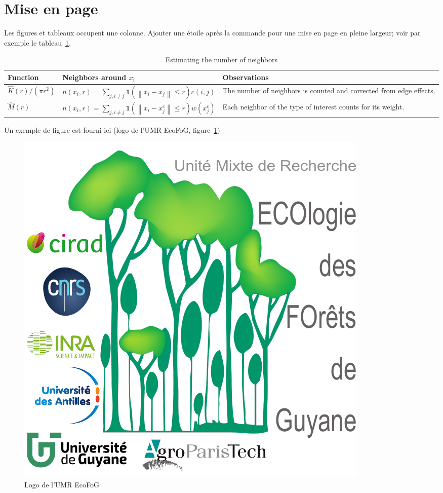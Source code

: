 \documentclass[fleqn,10pt]{ArtEcoFoG} %
\begin{document}
\section{Mise en page}\label{sec:misenpage}

Les figures et tableaux occupent une colonne.
Ajouter une étoile après la commande pour une mise en page en pleine largeur; voir par exemple le tableau~\ref{table:step1}.

\begin{table}
  \caption{Estimating the number of neighbors}
  \centering
  \begin{tabularx}{\textwidth}{p{3cm} p{7cm} X}
    \toprule
    Function & Neighbors around $x_i$ & Observations \\
    \midrule
    
    $\widehat{K} \left( r \right) / \left( \pi r^2 \right)$ 
    & $\displaystyle n\left(x_i,r\right) = \sum_{j, i \ne j} \mathbf{1} \left(\left\|x_i - x_j \right\| \le r \right) c\left( i,j \right)$
    & The number of neighbors is counted and corrected from edge effects. \\ 
    
    $\widehat{M} \left( r \right) $ 
    & $\displaystyle n \left( x_i, r \right) = \sum_{j, i \ne j}{\mathbf{1} \left( \left\| x_i - x^c_j \right\| \le r \right) w \left( x^c_j \right)}$ 
    & Each neighbor of the type of interest counts for its weight. \\
    
    \bottomrule
  \end{tabularx}
  \label{table:step1}
\end{table}
 
Un exemple de figure est fourni ici (logo de l'UMR EcoFoG, figure~\ref{fig:ecofog2017})

\begin{figure}
  \centering
  \includegraphics[width=0.8\linewidth]{EcoFoG2017}
  \caption{Logo de l'UMR EcoFoG}
  \label{fig:ecofog2017}
\end{figure}
\end{document}
